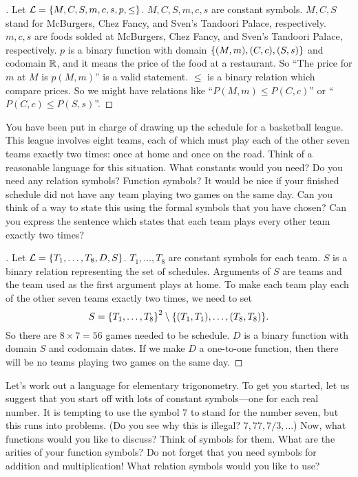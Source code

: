 \begin{proof}[]
  Let \(\mathcal{L} = \left\lbrace M, C, S, m, c, s, p, \leq\right\rbrace\).
  \(M, C, S, m, c, s\) are constant symbols.
  \(M, C, S\) stand for McBurgers, Chez Fancy, and Sven's Tandoori Palace, respectively.
  \(m, c, s\) are foods solded at McBurgers, Chez Fancy, and Sven's Tandoori Palace, respectively.
  \(p\) is a binary function with domain \(\left\lbrace(M, m), (C, c), (S, s)\right\rbrace\) and codomain \(\mathbb{R}\), and it means the price of the food at a restaurant.
  So ``The price for \(m\) at \(M\) is \(p(M, m)\)'' is a valid statement.
  \(\leq\) is a binary relation which compare prices.
  So we might have relations like ``\(P(M, m) \leq P(C, c)\)'' or ``\(P(C, c) \leq P(S, s)\)''.
\end{proof}

\begin{ex}\label{ex:1.2.4}
  You have been put in charge of drawing up the schedule for a basketball league.
  This league involves eight teams, each of which must play each of the other seven teams exactly two times:
  once at home and once on the road.
  Think of a reasonable language for this situation.
  What constants would you need?
  Do you need any relation symbols?
  Function symbols?
  It would be nice if your finished schedule did not have any team playing two games on the same day.
  Can you think of a way to state this using the formal symbols that you have chosen?
  Can you express the sentence which states that each team plays every other team exactly two times?
\end{ex}

\begin{proof}[]
  Let \(\mathcal{L} = \left\lbrace T_1, \dots, T_8, D, S\right\rbrace\).
  \(T_1, \dots, T_8\) are constant symbols for each team.
  \(S\) is a binary relation representing the set of schedules.
  Arguments of \(S\) are teams and the team used as the first argument plays at home.
  To make each team play each of the other seven teams exactly two times, we need to set
  \[
    S = \set{T_1, \dots, T_8}^2 \setminus \set{(T_1, T_1), \dots, (T_8, T_8)}.
  \]
  So there are \(8 \times 7 = 56\) games needed to be schedule.
  \(D\) is a binary function with domain \(S\) and codomain dates.
  If we make \(D\) a one-to-one function, then there will be no teams playing two games on the same day.
\end{proof}

\begin{ex}\label{ex:1.2.5}
  Let's work out a language for elementary trigonometry.
  To get you started, let us suggest that you start off with lots of constant symbols---one for each real number.
  It is tempting to use the symbol \(7\) to stand for the number seven, but this runs into problems.
  (Do you see why this is illegal?
  \(7, 77, 7/3, \dots\))
  Now, what functions would you like to discuss?
  Think of symbols for them.
  What are the arities of your function symbols?
  Do not forget that you need symbols for addition and multiplication!
  What relation symbols would you like to use?
\end{ex}

